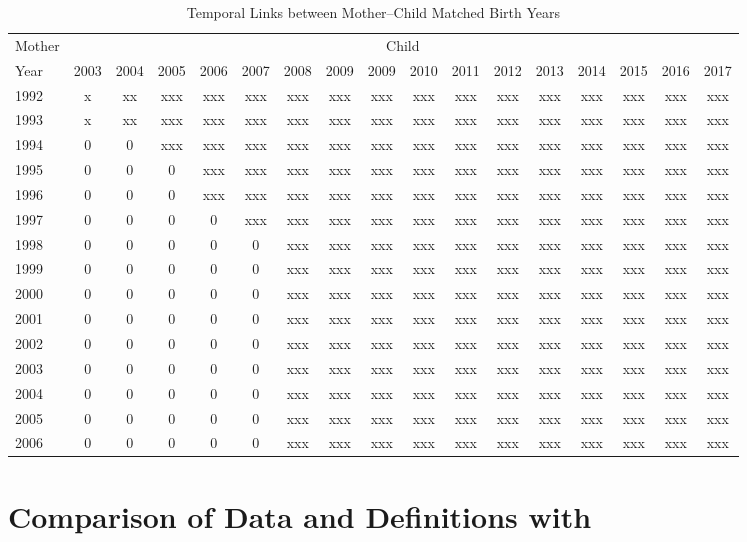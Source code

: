 \documentclass[11pt]{article}
\begin{document}
\begin{appendices}
    
  \begin{landscape}
  \begin{table}[htpb!]
    \centering
    \caption{Temporal Links between Mother--Child Matched Birth Years}
    \label{tab:birthChart}
    \begin{tabular}{lcccccccccccccccc} \toprule
    Mother & \multicolumn{16}{c}{Child} \\ \cmidrule(r){2-17}
    Year & 2003 & 2004 & 2005 & 2006 & 2007 & 2008 & 2009 & 2009 & 2010 & 2011 & 2012 & 2013 & 2014 & 2015 & 2016 & 2017 \\ \midrule
    1992 & x & xx & xxx & xxx & xxx & xxx & xxx & xxx & xxx & xxx & xxx & xxx & xxx & xxx & xxx & xxx \\
    1993 & x & xx & xxx & xxx & xxx & xxx & xxx & xxx & xxx & xxx & xxx & xxx & xxx & xxx & xxx & xxx \\
    1994 & 0 & 0  & xxx & xxx & xxx & xxx & xxx & xxx & xxx & xxx & xxx & xxx & xxx & xxx & xxx & xxx \\
    1995 & 0 & 0  & 0   & xxx & xxx & xxx & xxx & xxx & xxx & xxx & xxx & xxx & xxx & xxx & xxx & xxx \\
    1996 & 0 & 0  & 0   & xxx & xxx & xxx & xxx & xxx & xxx & xxx & xxx & xxx & xxx & xxx & xxx & xxx \\
    1997 & 0 & 0  & 0   & 0   & xxx & xxx & xxx & xxx & xxx & xxx & xxx & xxx & xxx & xxx & xxx & xxx \\
    1998 & 0 & 0  & 0   & 0   & 0   & xxx & xxx & xxx & xxx & xxx & xxx & xxx & xxx & xxx & xxx & xxx \\
    1999 & 0 & 0  & 0   & 0   & 0   & xxx & xxx & xxx & xxx & xxx & xxx & xxx & xxx & xxx & xxx & xxx \\
    2000 & 0 & 0  & 0   & 0   & 0   & xxx & xxx & xxx & xxx & xxx & xxx & xxx & xxx & xxx & xxx & xxx \\
    2001 & 0 & 0  & 0   & 0   & 0   & xxx & xxx & xxx & xxx & xxx & xxx & xxx & xxx & xxx & xxx & xxx \\
    2002 & 0 & 0  & 0   & 0   & 0   & xxx & xxx & xxx & xxx & xxx & xxx & xxx & xxx & xxx & xxx & xxx \\
    2003 & 0 & 0  & 0   & 0   & 0   & xxx & xxx & xxx & xxx & xxx & xxx & xxx & xxx & xxx & xxx & xxx \\
    2004 & 0 & 0  & 0   & 0   & 0   & xxx & xxx & xxx & xxx & xxx & xxx & xxx & xxx & xxx & xxx & xxx \\
    2005 & 0 & 0  & 0   & 0   & 0   & xxx & xxx & xxx & xxx & xxx & xxx & xxx & xxx & xxx & xxx & xxx \\
    2006 & 0 & 0  & 0   & 0   & 0   & xxx & xxx & xxx & xxx & xxx & xxx & xxx & xxx & xxx & xxx & xxx \\
    \bottomrule
    \end{tabular}
  \end{table}
  \end{landscape}


  \clearpage
  \section{Comparison of Data and Definitions with \citet{Bharadwajetal2013}}
  \label{app:BLNcomp}

  
  
  
  \end{appendices}
\end{document}
